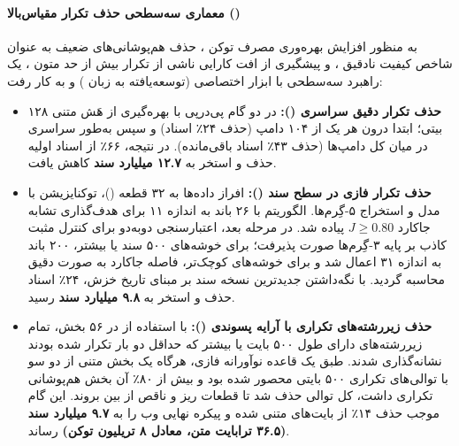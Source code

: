 \paragraph*{معماری سه‌سطحی حذف تکرار مقیاس‌بالا ()}
به منظور افزایش بهره‌وری مصرف توکن \cite{lee2022deduplicating}، حذف هم‌پوشانی‌های ضعیف به عنوان شاخص کیفیت نادقیق \cite{fang2025datasets}، و پیشگیری از افت کارایی ناشی از تکرار بیش از حد متون \cite{muennighoff2025scaling}، یک راهبرد سه‌سطحی با ابزار اختصاصی \textbf{} (توسعه‌یافته به زبان ) و \textbf{} به کار رفت:
\begin{itemize}
    \item \textbf{حذف تکرار دقیق سراسری ():} در دو گام پی‌درپی با بهره‌گیری از هَش متنی ۱۲۸ بیتی؛ ابتدا درون هر یک از ۱۰۴ دامپ (حذف ۲۴٪ اسناد) و سپس به‌طور سراسری در میان کل دامپ‌ها (حذف ۴۳٪ اسناد باقی‌مانده). در نتیجه، ۶۶٪ از اسناد اولیه حذف و استخر به \textbf{۱۲.۷ میلیارد سند} کاهش یافت.
    \item \textbf{حذف تکرار فازی در سطح سند ():} افراز داده‌ها به ۳۲ قطعه ()، توکنایزیشن با مدل  و استخراج ۵-گِرم‌ها. الگوریتم  با ۲۶ باند به اندازه ۱۱ برای هدف‌گذاری تشابه جاکارد $J \ge 0.80$ پیاده شد. در مرحله بعد، اعتبارسنجی دوبه‌دو برای کنترل مثبت کاذب بر پایه ۳-گِرم‌ها صورت پذیرفت؛ برای خوشه‌های ۵۰۰ سند یا بیشتر، ۲۰۰ باند به اندازه ۳۱ اعمال شد و برای خوشه‌های کوچک‌تر، فاصله جاکارد به صورت دقیق محاسبه گردید. با نگه‌داشتن جدیدترین نسخه سند بر مبنای تاریخ خزش، ۲۴٪ اسناد حذف و استخر به \textbf{۹.۸ میلیارد سند} رسید.
    \item \textbf{حذف زیررشته‌های تکراری با آرایه پسوندی ():} با استفاده از  در ۵۶ بخش، تمام زیررشته‌های دارای طول ۵۰۰ بایت یا بیشتر که حداقل دو بار تکرار شده بودند نشانه‌گذاری شدند. طبق یک قاعده نوآورانه فازی، هرگاه یک بخش متنی از دو سو با توالی‌های تکراری ۵۰۰ بایتی محصور شده بود و بیش از ۸۰٪ آن بخش هم‌پوشانی تکراری داشت، کل توالی حذف شد تا قطعات ریز و ناقص از بین بروند. این گام موجب حذف ۱۴٪ از بایت‌های متنی شده و پیکره نهایی وب را به \textbf{۹.۷ میلیارد سند (۳۶.۵ ترابایت متن، معادل ۸ تریلیون توکن)} رساند.
\end{itemize}

